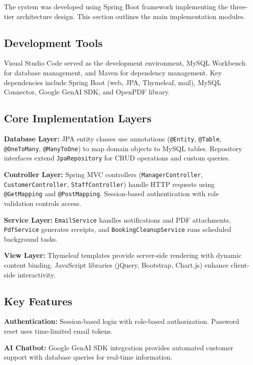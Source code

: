 The system was developed using Spring Boot framework implementing the three-tier architecture design. This section outlines the main implementation modules.

\subsection{Development Tools}

Visual Studio Code served as the development environment, MySQL Workbench for database management, and Maven for dependency management. Key dependencies include Spring Boot (web, JPA, Thymeleaf, mail), MySQL Connector, Google GenAI SDK, and OpenPDF library.

\subsection{Core Implementation Layers}

\textbf{Database Layer:} JPA entity classes use annotations (\texttt{@Entity}, \texttt{@Table}, \texttt{@OneToMany}, \texttt{@ManyToOne}) to map domain objects to MySQL tables. Repository interfaces extend \texttt{JpaRepository} for CRUD operations and custom queries.

\textbf{Controller Layer:} Spring MVC controllers (\texttt{ManagerController}, \texttt{CustomerController}, \texttt{StaffController}) handle HTTP requests using \texttt{@GetMapping} and \texttt{@PostMapping}. Session-based authentication with role validation controls access.

\textbf{Service Layer:} \texttt{EmailService} handles notifications and PDF attachments, \texttt{PdfService} generates receipts, and \texttt{BookingCleanupService} runs scheduled background tasks.

\textbf{View Layer:} Thymeleaf templates provide server-side rendering with dynamic content binding. JavaScript libraries (jQuery, Bootstrap, Chart.js) enhance client-side interactivity.

\subsection{Key Features}

\textbf{Authentication:} Session-based login with role-based authorization. Password reset uses time-limited email tokens.

\textbf{AI Chatbot:} Google GenAI SDK integration provides automated customer support with database queries for real-time information.

